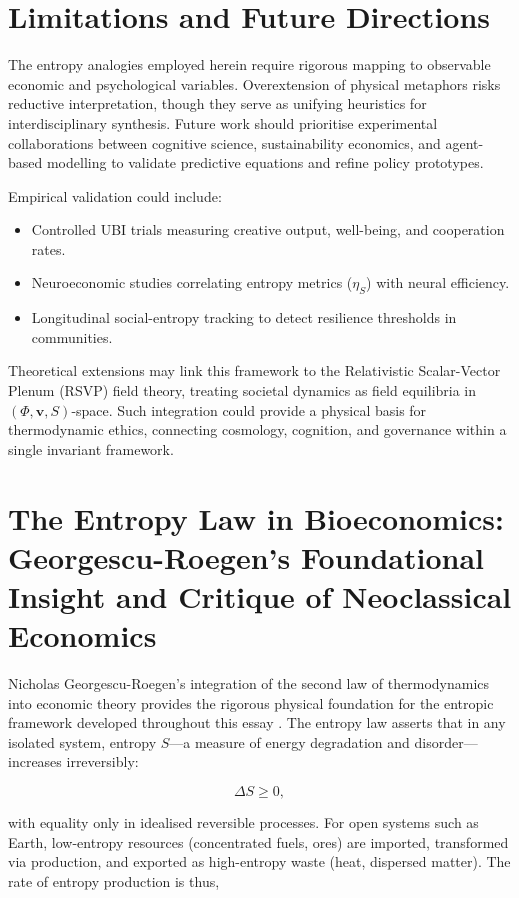 \documentclass[12pt,a4paper]{article}
\begin{document}
\section{Limitations and Future Directions}

The entropy analogies employed herein require rigorous mapping 
to observable economic and psychological variables. 
Overextension of physical metaphors risks reductive interpretation, 
though they serve as unifying heuristics for interdisciplinary synthesis. 
Future work should prioritise experimental collaborations 
between cognitive science, sustainability economics, 
and agent-based modelling to validate predictive equations 
and refine policy prototypes.

Empirical validation could include:
\begin{itemize}
\item Controlled UBI trials measuring creative output, well-being, and cooperation rates.  
\item Neuroeconomic studies correlating entropy metrics (\(\eta_S\)) with neural efficiency.  
\item Longitudinal social-entropy tracking to detect resilience thresholds in communities.
\end{itemize}

Theoretical extensions may link this framework to 
the Relativistic Scalar-Vector Plenum (RSVP) field theory, 
treating societal dynamics as field equilibria in \((\Phi, \mathbf{v}, S)\)-space.  
Such integration could provide a physical basis for thermodynamic ethics, 
connecting cosmology, cognition, and governance within a single invariant framework.

\section{The Entropy Law in Bioeconomics: Georgescu-Roegen’s Foundational Insight and Critique of Neoclassical Economics}

Nicholas Georgescu-Roegen’s integration of the second law of thermodynamics into economic theory 
provides the rigorous physical foundation for the entropic framework developed throughout this essay 
\citep{georgescu1971entropy}. The entropy law asserts that in any isolated system, 
entropy \(S\)---a measure of energy degradation and disorder---increases irreversibly:

\[
\Delta S \geq 0,
\]

with equality only in idealised reversible processes. For open systems such as Earth, 
low-entropy resources (concentrated fuels, ores) are imported, transformed via production, 
and exported as high-entropy waste (heat, dispersed matter). The rate of entropy production is thus,
\end{document}
